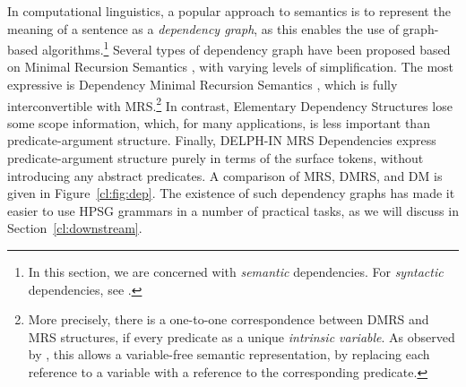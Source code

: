 \documentclass[output=paper,nonflat]{langsci/langscibook}
\begin{document}
In computational linguistics,
a popular approach to semantics is to represent the meaning of a sentence as a \textit{dependency graph},
as this enables the use of graph-based algorithms.\footnote{%
	In this section, we are concerned with \emph{semantic} dependencies.
	For \emph{syntactic} dependencies, see .
}
Several types of dependency graph have been proposed
based on Minimal Recursion Semantics \citep[MRS;][]{CFPS2005a},
with varying levels of simplification.
The most expressive is Dependency Minimal Recursion Semantics \citep[DMRS;][]{copestake2009dmrs},
which is fully interconvertible with MRS.\footnote{%
	More precisely, there is a one-to-one correspondence between DMRS and MRS structures,
	if every predicate as a unique \textit{intrinsic variable}.
	As observed by \citet{oepen2006eds}, this allows a variable-free semantic representation,
	by replacing each reference to a variable with a reference to the corresponding predicate.
}
In contrast, Elementary Dependency Structures \citep[EDS;][]{oepen2006eds}
lose some scope information,
which, for many applications, is less important than predicate-argument structure.
Finally, DELPH-IN MRS Dependencies \citep[DM;][]{ivanova2012dm}
express predicate-argument structure purely in terms of the surface tokens,
without introducing any abstract predicates.
A comparison of MRS, DMRS, and DM is given in Figure~\ref{cl:fig:dep}.
The existence of such dependency graphs
has made it easier to use HPSG grammars in a number of practical tasks,
as we will discuss in Section~\ref{cl:downstream}.


\end{document}
